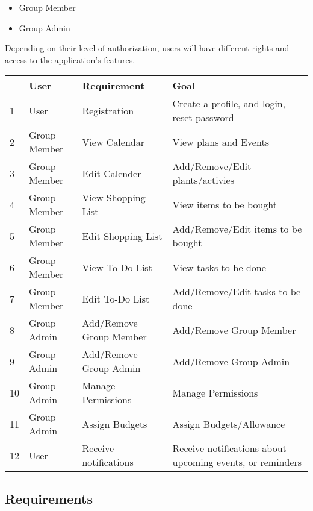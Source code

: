 \documentclass[12pt]{article}
\begin{document}
\begin{itemize}
    \setlength\itemsep{0em}
    \item Group Member
    \item Group Admin
\end{itemize}

Depending on their level of authorization, users will have different rights and access to the application's features. 

\setlength{\tabcolsep}{3pt}

\begin{table}[h]
    \small
    \begin{tabularx}{\textwidth}{|p{12pt}|p{85pt}|X|X|}
        \hline  & User & Requirement & Goal \\
        \hline 1 & User & Registration & Create a profile, and login, reset password \\ 
        \hline 2 & Group Member & View Calendar & View plans and Events \\
        \hline 3 & Group Member & Edit Calender & Add/Remove/Edit plants/activies \\
        \hline 4 & Group Member & View Shopping List & View items to be bought \\
        \hline 5 & Group Member & Edit Shopping List & Add/Remove/Edit items to be bought \\
        \hline 6 & Group Member & View To-Do List & View tasks to be done \\
        \hline 7 & Group Member & Edit To-Do List & Add/Remove/Edit tasks to be done \\
        \hline 8 & Group Admin & Add/Remove Group Member & Add/Remove Group Member \\
        \hline 9 & Group Admin & Add/Remove Group Admin & Add/Remove Group Admin \\
        \hline 10 & Group Admin & Manage Permissions & Manage Permissions \\
        \hline 11 & Group Admin & Assign Budgets & Assign Budgets/Allowance \\
        \hline 12 & User & Receive notifications & Receive notifications about upcoming events, or reminders \\
        \hline
    \end{tabularx}
\end{table}

\subsection{Requirements}
\end{document}
